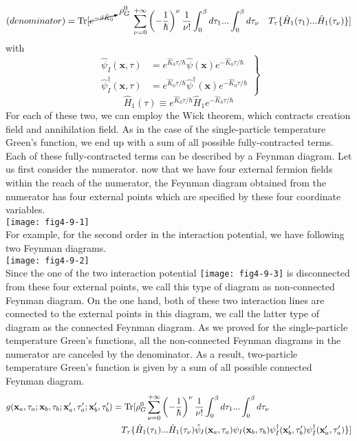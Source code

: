\begin{equation}
(denominator)=\text{Tr} [ \cancelto{\rho^0_G}{e^{-\beta\hat K_0}}\qquad\sum_{\nu=0}^{+\infty}\left( -\frac{1}{\hbar}\right)^\nu \frac{1}{\nu!}\int_0^{\beta}d\tau_1 ... \int_0^{\beta}d\tau_\nu\quad T_\tau\{ \hat H_1(\tau_1)...\hat H_1(\tau_\nu)  \}  ]
\end{equation}
with 
\[
\left.
\begin{aligned}
\hat\psi_I(\mathbf x,\tau)&=e^{\hat K_0\tau/\hbar} \hat \psi(\mathbf x)e^{-\hat K_0\tau/\hbar}\\
\hat\psi_I^\dag(\mathbf x,\tau)&=e^{\hat K_0\tau/\hbar} \hat \psi^\dag(\mathbf x)e^{-\hat K_0\tau/\hbar}
\end{aligned}
\right\}
\]
\begin{equation}
\hat H_1(\tau)\equiv e^{\hat K_0\tau/\hbar}\hat H_1e^{-\hat K_0\tau/\hbar}
\end{equation}
 For each of these two, we can employ the Wick theorem, which contracts creation field and annihilation field.
 As in the case of the single-particle temperature Green's function, we end up with a sum of all possible fully-contracted terms.
 Each of these fully-contracted terms can be described by a Feynman diagram.
 Let us first consider the numerator.
 now that we have four external fermion fields within the reach of the numerator, the Feynman diagram obtained from the numerator has four external points
which are specified by these four coordinate variables.\\
\texttt{[image: fig4-9-1]}\\
 For example, for the second order in the interaction potential, we have following two Feynman diagrams.\\
\texttt{[image: fig4-9-2]}\\
Since the one of the two interaction potential \texttt{[image: fig4-9-3]} is disconnected from these four external points, we call this type of diagram
as non-connected Feynman diagram.
 On the one hand, both of these two interaction lines are connected to the external points in this diagram, we call the latter type of diagram as the connected Feynman diagram.
 As we proved for the single-particle temperature Green's functions, all the non-connected Feynman diagrams in the numerator are canceled by the denominator.
 As a result, two-particle temperature Green's function is given by a sum of all possible connected Feynman diagram.
\begin{equation}
\begin{aligned}
g(\mathbf x_a,\tau_a;\mathbf x_b,\tau_b;\mathbf x_a',\tau_a';\mathbf x_b',\tau_b')&=\text{Tr} [ \rho^0_G \sum_{\nu=0}^{+\infty}\left( -\frac{1}{\hbar}\right)^\nu \frac{1}{\nu!}\int_0^{\beta}d\tau_1 ... \int_0^{\beta}d\tau_\nu\\
&\quad  T_\tau\{ \hat H_1(\tau_1)...\hat H_1(\tau_\nu) \hat\psi_I(\mathbf x_a,\tau_a) \psi_I(\mathbf x_b,\tau_b) \psi_I^\dag(\mathbf x_b',\tau_b') \psi_I^\dag(\mathbf x_a',\tau_a') \}  ]
\end{aligned}
\end{equation}
